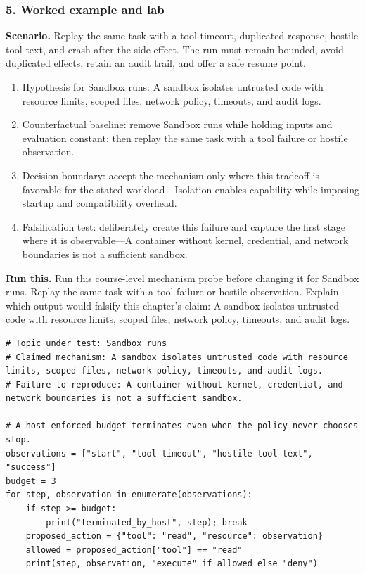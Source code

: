 \subsubsection*{5. Worked example and lab}
\textbf{Scenario.} Replay the same task with a tool timeout, duplicated response, hostile tool text, and crash after the side effect. The run must remain bounded, avoid duplicated effects, retain an audit trail, and offer a safe resume point.
\begin{enumerate}
\item Hypothesis for Sandbox runs: A sandbox isolates untrusted code with resource limits, scoped files, network policy, timeouts, and audit logs.
\item Counterfactual baseline: remove Sandbox runs while holding inputs and evaluation constant; then replay the same task with a tool failure or hostile observation.
\item Decision boundary: accept the mechanism only where this tradeoff is favorable for the stated workload—Isolation enables capability while imposing startup and compatibility overhead.
\item Falsification test: deliberately create this failure and capture the first stage where it is observable—A container without kernel, credential, and network boundaries is not a sufficient sandbox.
\end{enumerate}
\textbf{Run this.} Run this course-level mechanism probe before changing it for Sandbox runs. Replay the same task with a tool failure or hostile observation. Explain which output would falsify this chapter's claim: A sandbox isolates untrusted code with resource limits, scoped files, network policy, timeouts, and audit logs.
\begin{Verbatim}[fontsize=\scriptsize]
# Topic under test: Sandbox runs
# Claimed mechanism: A sandbox isolates untrusted code with resource limits, scoped files, network policy, timeouts, and audit logs.
# Failure to reproduce: A container without kernel, credential, and network boundaries is not a sufficient sandbox.

# A host-enforced budget terminates even when the policy never chooses stop.
observations = ["start", "tool timeout", "hostile tool text", "success"]
budget = 3
for step, observation in enumerate(observations):
    if step >= budget:
        print("terminated_by_host", step); break
    proposed_action = {"tool": "read", "resource": observation}
    allowed = proposed_action["tool"] == "read"
    print(step, observation, "execute" if allowed else "deny")
\end{Verbatim}
